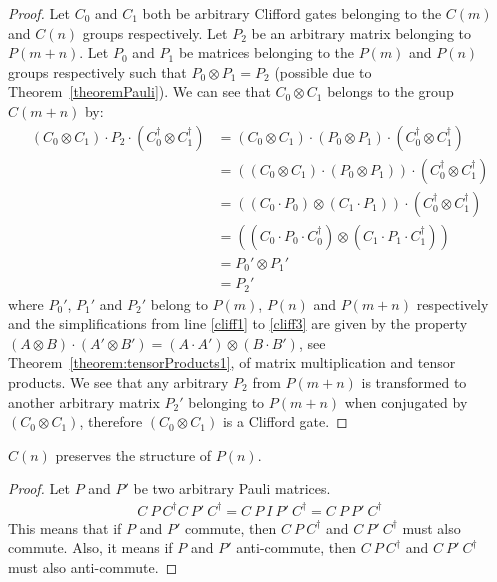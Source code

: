 \begin{proof}
Let $C_0$ and $C_1$ both be arbitrary Clifford gates belonging to the $C(m)$ and $C(n)$ groups respectively. Let $P_2$ be an arbitrary matrix belonging to $P(m + n)$. Let $P_0$ and $P_1$ be matrices belonging to the $P(m)$ and $P(n)$ groups respectively such that $P_0 \otimes P_1 = P_2$ (possible due to Theorem~\ref{theoremPauli}). We can see that $C_0 \otimes C_1$ belongs to the group $C(m + n)$ by:
\begin{align}
(C_0 \otimes C_1) \cdot P_2 \cdot (C_0^{\dagger} \otimes C_1^{\dagger})
&= (C_0 \otimes C_1) \cdot (P_0 \otimes P_1)\cdot(C_0^{\dagger} \otimes C_1^{\dagger}) \\
&= ((C_0 \otimes C_1) \cdot (P_0 \otimes P_1)) \cdot (C_0^{\dagger} \otimes C_1^{\dagger}) \label{cliff1}\\
&= ((C_0 \cdot P_0)\otimes(C_1 \cdot P_1)) \cdot (C_0^{\dagger} \otimes C_1^{\dagger}) \label{cliff2}\\
&= ((C_0 \cdot P_0 \cdot C_0^{\dagger})\otimes(C_1 \cdot P_1 \cdot C_1^{\dagger})) \label{cliff3}\\
&= P_0' \otimes P_1'\\
&= P_2'
\end{align}
where $P_0'$, $P_1'$ and $P_2'$ belong to $P(m)$, $P(n)$ and $P(m + n)$ respectively and the simplifications from line \ref{cliff1} to \ref{cliff3} are given by the property $(A \otimes B)\cdot(A' \otimes B') = (A \cdot A')\otimes(B \cdot B')$, see Theorem~\ref{theorem:tensorProducts1}, of matrix multiplication and tensor products. We see that any arbitrary $P_2$ from $P(m + n)$ is transformed to another arbitrary matrix $P_2'$ belonging to $P(m + n)$ when conjugated by $(C_0 \otimes C_1)$, therefore $(C_0 \otimes C_1)$ is a Clifford gate.
\end{proof}

\begin{theorem}
\label{theorem:CliffordPreservesStructure}
$C(n)$ preserves the structure of $P(n)$.
\end{theorem}
\begin{proof}
Let $P$ and $P'$ be two arbitrary Pauli matrices.
\begin{align}
\label{eq:cliffordsPreservePaulis}
C \ P \ C^{\dagger}C \ P' \ C^{\dagger} = C \ P \ I \ P' \ C^{\dagger} = C \ P \ P' \ C^{\dagger}
\end{align}
This means that if $P$ and $P'$ commute, then $C \ P \ C^{\dagger}$ and $C \ P' \ C^{\dagger}$ must also commute. Also, it means if $P$ and $P'$ anti-commute, then $C \ P \ C^{\dagger}$ and $C \ P' \ C^{\dagger}$ must also anti-commute.
\end{proof}

